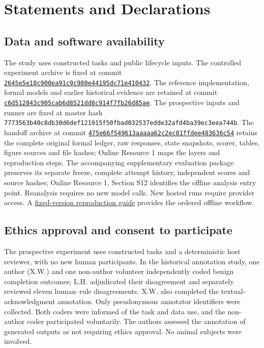 \documentclass[10pt,a4paper,twocolumn]{article}
\begin{document}
\section*{Statements and Declarations}
\subsection*{Data and software availability}
The study uses constructed tasks and public lifecycle inputs. The controlled experiment archive is fixed at commit \href{https://github.com/lhh666-6/auto-dete/tree/2645e5e18c900ea91c9c980e44195dc71e410432/DKE-supplement}{\nolinkurl{2645e5e18c900ea91c9c980e44195dc71e410432}}. The reference implementation, formal models and earlier historical evidence are retained at commit \href{https://github.com/lhh666-6/auto-dete/tree/c6d512843c905cab6d8521dd8c914f7fb26d85ae/latest}{\nolinkurl{c6d512843c905cab6d8521dd8c914f7fb26d85ae}}. The prospective inputs and runner are fixed at master hash \nolinkurl{7773563b40c8db30d6def121915f50fbad032537edde32afd4ba39ec3eea744b}. The handoff archive at commit \href{https://github.com/lhh666-6/auto-dete/tree/475e66f549613aaaaa62c2ec81ffdee483636c54/cloud-handoff}{\nolinkurl{475e66f549613aaaaa62c2ec81ffdee483636c54}} retains the complete original formal ledger, raw responses, state snapshots, scorer, tables, figure sources and file hashes; Online Resource 1 maps the layers and reproduction steps. The accompanying supplementary evaluation package preserves its separate freeze, complete attempt history, independent scores and source hashes; Online Resource 1, Section S12 identifies the offline analysis entry point. Reanalysis requires no new model calls. New hosted runs require provider access. A \href{https://github.com/lhh666-6/auto-dete/blob/kais-reproducibility-2026-10-07/REPRODUCIBILITY.md}{fixed-version reproduction guide} provides the ordered offline workflow.

\subsection*{Ethics approval and consent to participate}
The prospective experiment uses constructed tasks and a deterministic host reviewer, with no new human participants. In the historical annotation study, one author (X.W.) and one non-author volunteer independently coded benign completion outcomes; L.H. adjudicated their disagreement and separately reviewed eleven human--rule disagreements. X.W. also completed the textual-acknowledgment annotation. Only pseudonymous annotator identifiers were collected. Both coders were informed of the task and data use, and the non-author coder participated voluntarily. The authors assessed the annotation of generated outputs as not requiring ethics approval. No animal subjects were involved.
\end{document}
